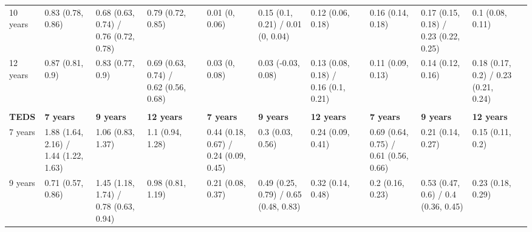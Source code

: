 \begin{tabular}{llllrlllrlllr}
  10 years                                                      & 0.83 (0.78, 0.86)                         & 0.68 (0.63, 0.74) / 0.76 (0.72, 0.78)       & 0.79 (0.72, 0.85)                         &  & 0.01 (0, 0.06)                        & 0.15 (0.1, 0.21) / 0.01 (0, 0.04)     & 0.12 (0.06, 0.18)                     &  & 0.16 (0.14, 0.18)                     & 0.17 (0.15, 0.18) / 0.23 (0.22, 0.25) & 0.1 (0.08, 0.11)                      & \\
  12 years                                                      & 0.87 (0.81, 0.9)                          & 0.83 (0.77, 0.9)                            & 0.69 (0.63, 0.74) / 0.62 (0.56, 0.68)     &  & 0.03 (0, 0.08)                        & 0.03 (-0.03, 0.08)                    & 0.13 (0.08, 0.18) / 0.16 (0.1, 0.21)  &  & 0.11 (0.09, 0.13)                     & 0.14 (0.12, 0.16)                     & 0.18 (0.17, 0.2) / 0.23 (0.21, 0.24)  & \\
                                                                & \multicolumn{3}{c}{}                      &                                             & \multicolumn{3}{c}{}                      &  & \multicolumn{3}{c}{}                  & \\
  \cmidrule{2-4}\textbf{TEDS} & \textbf{7 years}                          & \textbf{9 years}                            & \textbf{12 years}                         &  & \textbf{7 years}                      & \textbf{9 years}                      & \textbf{12 years}                     &  & \textbf{7 years}                      & \textbf{9 years}                      & \textbf{12 years}                     & \\
  \cmidrule{1-4}    7 years                                    & 1.88 (1.64, 2.16) / 1.44 (1.22, 1.63)     & 1.06 (0.83, 1.37)                           & 1.1 (0.94, 1.28)                          &  & 0.44 (0.18, 0.67) / 0.24 (0.09, 0.45) & 0.3 (0.03, 0.56)                      & 0.24 (0.09, 0.41)                     &  & 0.69 (0.64, 0.75) / 0.61 (0.56, 0.66) & 0.21 (0.14, 0.27)                     & 0.15 (0.11, 0.2)                      & \\
  9 years                                                       & 0.71 (0.57, 0.86)                         & 1.45 (1.18, 1.74) / 0.78 (0.63, 0.94)       & 0.98 (0.81, 1.19)                         &  & 0.21 (0.08, 0.37)                     & 0.49 (0.25, 0.79) / 0.65 (0.48, 0.83) & 0.32 (0.14, 0.48)                     &  & 0.2 (0.16, 0.23)                      & 0.53 (0.47, 0.6) / 0.4 (0.36, 0.45)   & 0.23 (0.18, 0.29)                     & \\

\end{tabular}
